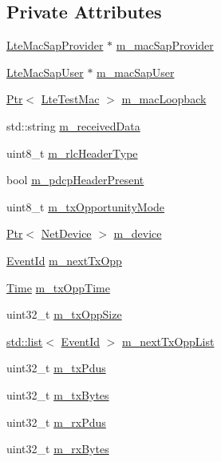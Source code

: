 \subsection*{Private Attributes}
\begin{DoxyCompactItemize}
\item 
\hyperlink{classns3_1_1LteMacSapProvider}{Lte\+Mac\+Sap\+Provider} $\ast$ \hyperlink{classns3_1_1LteTestMac_af089ac1113d0798e1f0d82572e0449b4}{m\+\_\+mac\+Sap\+Provider}
\item 
\hyperlink{classns3_1_1LteMacSapUser}{Lte\+Mac\+Sap\+User} $\ast$ \hyperlink{classns3_1_1LteTestMac_ab7d2f5362a3e07bc7694286b0fe5debd}{m\+\_\+mac\+Sap\+User}
\item 
\hyperlink{classns3_1_1Ptr}{Ptr}$<$ \hyperlink{classns3_1_1LteTestMac}{Lte\+Test\+Mac} $>$ \hyperlink{classns3_1_1LteTestMac_afaba9cd99a3ceaf0bf2a001cbc9138f0}{m\+\_\+mac\+Loopback}
\item 
std\+::string \hyperlink{classns3_1_1LteTestMac_a93dc99bf8c2aedad9fc1aeeaaa001862}{m\+\_\+received\+Data}
\item 
uint8\+\_\+t \hyperlink{classns3_1_1LteTestMac_acc5726d7fcaab0028ea9fc864468cd9f}{m\+\_\+rlc\+Header\+Type}
\item 
bool \hyperlink{classns3_1_1LteTestMac_a9bcba00d062a466b426c890e7eb24941}{m\+\_\+pdcp\+Header\+Present}
\item 
uint8\+\_\+t \hyperlink{classns3_1_1LteTestMac_a1f877e33d19780bf870ba97c296e5b25}{m\+\_\+tx\+Opportunity\+Mode}
\item 
\hyperlink{classns3_1_1Ptr}{Ptr}$<$ \hyperlink{classns3_1_1NetDevice}{Net\+Device} $>$ \hyperlink{classns3_1_1LteTestMac_afec9c26af6d1ac8a9c3d7bf0597425c4}{m\+\_\+device}
\item 
\hyperlink{classns3_1_1EventId}{Event\+Id} \hyperlink{classns3_1_1LteTestMac_a984a6f9333b75da92ffed4003e64a74d}{m\+\_\+next\+Tx\+Opp}
\item 
\hyperlink{classns3_1_1Time}{Time} \hyperlink{classns3_1_1LteTestMac_a80a232a577812123507da849b192edb3}{m\+\_\+tx\+Opp\+Time}
\item 
uint32\+\_\+t \hyperlink{classns3_1_1LteTestMac_a358c818a52e4ae246e676b7c4714da7f}{m\+\_\+tx\+Opp\+Size}
\item 
\hyperlink{openflow-interface_8h_afd9bcfa176617760671b67580f536fa7}{std\+::list}$<$ \hyperlink{classns3_1_1EventId}{Event\+Id} $>$ \hyperlink{classns3_1_1LteTestMac_a7e80df8e89db33c7c19f810ec1c3f653}{m\+\_\+next\+Tx\+Opp\+List}
\item 
uint32\+\_\+t \hyperlink{classns3_1_1LteTestMac_af389dc31bf05509d27a8314b3dd6b1e1}{m\+\_\+tx\+Pdus}
\item 
uint32\+\_\+t \hyperlink{classns3_1_1LteTestMac_afb58baaba2fc9d6108db176c23a0ddfb}{m\+\_\+tx\+Bytes}
\item 
uint32\+\_\+t \hyperlink{classns3_1_1LteTestMac_acd1cacbaa7e3b28649ea2cef3f801df2}{m\+\_\+rx\+Pdus}
\item 
uint32\+\_\+t \hyperlink{classns3_1_1LteTestMac_a4ff0ccbe1f5ce36913b89e292c4892da}{m\+\_\+rx\+Bytes}
\end{DoxyCompactItemize}
